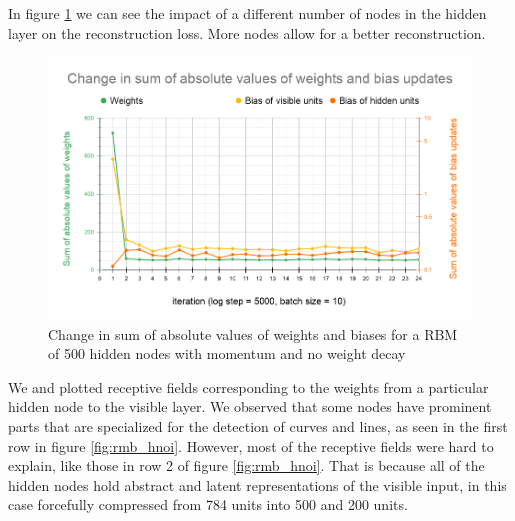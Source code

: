 \documentclass[a4paper]{article}
\begin{document}
In figure \ref{fig:rbm_sums} we can see the impact of a different number of nodes in the hidden layer on the reconstruction loss. More nodes allow for a better reconstruction.

\begin{figure}[H]
    \centering
    \includegraphics[width=1.\linewidth]{img/4.1 Change in sum of absolute values of weights and bias updates.png}
    \caption{Change in sum of absolute values of weights and biases for a RBM of 500 hidden nodes with momentum and no weight decay}
    \label{fig:rbm_sums}
\end{figure}

We and plotted receptive fields corresponding to the weights from a particular hidden node to the visible layer. We observed that some nodes have prominent parts that are specialized for the detection of curves and lines, as seen in the first row in figure \ref{fig:rmb_hnoi}. However, most of the receptive fields were hard to explain, like those in row 2 of figure \ref{fig:rmb_hnoi}. That is because all of the hidden nodes hold abstract and latent representations of the visible input, in this case forcefully compressed from 784 units into 500 and 200 units.
\end{document}
